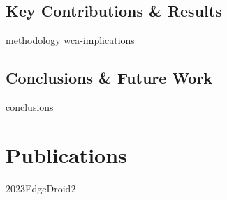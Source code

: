 \documentclass[electronic,oldfontcommands]{kthesis}
\begin{document}
\chapter{Key Contributions \& Results}\label{chap:contributions}
{methodology}
{wca-implications}

\chapter{Conclusions \& Future Work}\label{chap:conclusions}
{conclusions}

\printglossary[type=\acronymtype]%
\printbibliography[
	heading=bibintoc,
	title=References,
    notcategory=thesispapers
]%

\renewcommand\chaptername{\newchaptername}
\renewcommand*{\thechapter}{\Alph{chapter}}
\part{Publications}\label{part:publications}






{2023EdgeDroid2}

% 
\end{document}
